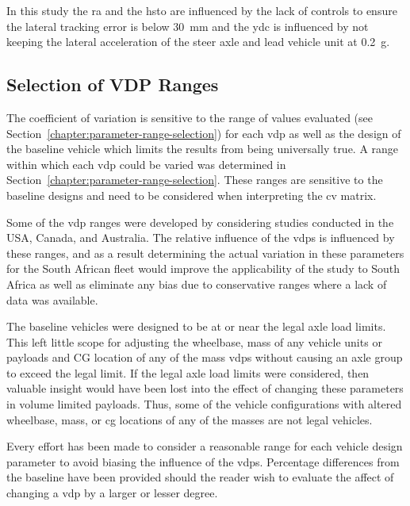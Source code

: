 In this study the \gls{ra} and the \gls{hsto} are influenced by the lack of controls to ensure the lateral tracking error is below 30~mm and the \gls{ydc} is influenced by not keeping the lateral acceleration of the steer axle and lead vehicle unit at 0.2~g.

\subsection{Selection of VDP Ranges}\label{section:discussion-limitations-range}

The coefficient of variation is sensitive to the range of values evaluated (see Section~\ref{chapter:parameter-range-selection}) for each \gls{vdp} as well as the design of the baseline vehicle which limits the results from being universally true. A range within which each \gls{vdp} could be varied was determined in Section~\ref{chapter:parameter-range-selection}. These ranges are sensitive to the baseline designs and need to be considered when interpreting the \gls{cv} matrix.

Some of the \gls{vdp} ranges were developed by considering studies conducted in the USA, Canada, and Australia. The relative influence of the \glspl{vdp} is influenced by these ranges, and as a result determining the actual variation in these parameters for the South African fleet would improve the applicability of the study to South Africa as well as eliminate any bias due to conservative ranges where a lack of data was available.

The baseline vehicles were designed to be at or near the legal axle load limits. This left little scope for adjusting the wheelbase, mass of any vehicle units or payloads and CG location of any of the mass \glspl{vdp} without causing an axle group to exceed the legal limit. If the legal axle load limits were considered, then valuable insight would have been lost into the effect of changing these parameters in volume limited payloads. Thus, some of the vehicle configurations with altered wheelbase, mass, or \gls{cg} locations of any of the masses are not legal vehicles.

Every effort has been made to consider a reasonable range for each vehicle design parameter to avoid biasing the influence of the \glspl{vdp}. Percentage differences from the baseline have been provided should the reader wish to evaluate the affect of changing a \gls{vdp} by a larger or lesser degree.